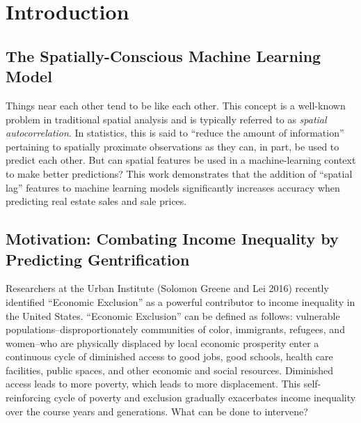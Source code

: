 \documentclass[12pt,]{article}
\begin{document}
\pagestyle{plain}
\justify

\hypertarget{introduction}{%
\section{Introduction}\label{introduction}}

\hypertarget{the-spatially-conscious-machine-learning-model}{%
\subsection{The Spatially-Conscious Machine Learning
Model}\label{the-spatially-conscious-machine-learning-model}}

Things near each other tend to be like each other. This concept is a
well-known problem in traditional spatial analysis and is typically
referred to as \emph{spatial autocorrelation}. In statistics, this is
said to ``reduce the amount of information'' pertaining to spatially
proximate observations as they can, in part, be used to predict each
other. But can spatial features be used in a machine-learning context to
make better predictions? This work demonstrates that the addition of
``spatial lag'' features to machine learning models significantly
increases accuracy when predicting real estate sales and sale prices.

\hypertarget{motivation-combating-income-inequality-by-predicting-gentrification}{%
\subsection{Motivation: Combating Income Inequality by Predicting
Gentrification}\label{motivation-combating-income-inequality-by-predicting-gentrification}}

Researchers at the Urban Institute (Solomon Greene and Lei 2016)
recently identified ``Economic Exclusion'' as a powerful contributor to
income inequality in the United States. ``Economic Exclusion'' can be
defined as follows: vulnerable populations--disproportionately
communities of color, immigrants, refugees, and women--who are
physically displaced by local economic prosperity enter a continuous
cycle of diminished access to good jobs, good schools, health care
facilities, public spaces, and other economic and social resources.
Diminished access leads to more poverty, which leads to more
displacement. This self-reinforcing cycle of poverty and exclusion
gradually exacerbates income inequality over the course years and
generations. What can be done to intervene?
\end{document}
